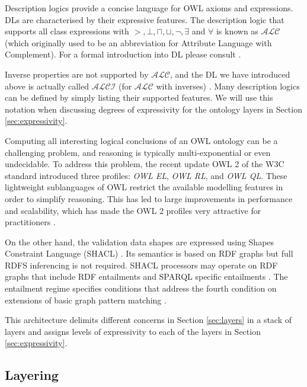 	Description logics provide a concise language for OWL axioms and expressions. DLs are characterised by their expressive features. The description logic that supports all class expressions with $>, \bot, \sqcap, \sqcup, \neg, \exists$ and $\forall$ is known as $\mathcal{ALC}$ (which originally used to be an abbreviation for Attribute Language with Complement). For a formal introduction into DL please consult \citet{dl-baader2004description}.
	
	Inverse properties are not supported by $\mathcal{ALC}$, and the DL we have introduced above is actually called $\mathcal{ALCI}$ (for $\mathcal{ALC}$ with inverses) \cite{krotzsch2012owl}. Many description logics can be defined by simply listing their supported features. We will use this notation when discussing degrees of expressivity for the ontology layers in Section \ref{sec:expressivity}.
	
	Computing all interesting logical conclusions of an OWL ontology can be a challenging problem, and reasoning is typically multi-exponential or even undecidable. To address this problem, the recent update OWL 2 of the W3C standard \citep{owl2.0,owl2} introduced three profiles: \textit{OWL EL}, \textit{OWL RL}, and \textit{OWL QL}. These lightweight sublanguages of OWL restrict the available modelling features in order to simplify reasoning. This has led to large improvements in performance and scalability, which has made the OWL 2 profiles very attractive for practitioners \citep{krotzsch2012owl}.
	
	On the other hand, the validation data shapes are expressed using Shapes Constraint Language (SHACL) \cite{shacl-spec}. Its semantics is based on RDF graphs but full RDFS inferencing is not required. SHACL processors may operate on RDF graphs that include RDF entailments \citep{rdf11-semantics} and SPARQL specific entailments \citep{sparql11-entailment}. The entailment regime specifies conditions that address the fourth condition on extensions of basic graph pattern matching \citep{rdf-semantics,rdf11-semantics}. 
	
	This architecture delimits different concerns in Section \ref{sec:layers} in a stack of layers and assigns levels of expressivity to each of the layers in Section \ref{sec:expressivity}.
	
	
	\subsection{Layering}
	\label{sec:layering}